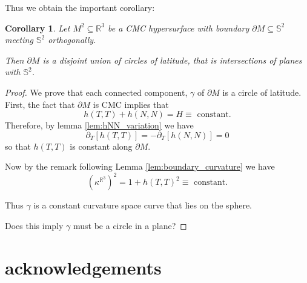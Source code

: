 \documentclass[10pt]{amsart}
\newcommand{\R}{\ensuremath{\mathbb{R}}}
\renewcommand{\S}{\ensuremath{\mathbb{S}}}
\newtheorem{cor}[thm]{Corollary}
\theoremstyle{remark}
\begin{document}
Thus we obtain the important corollary:
\begin{cor}
Let \(M^2 \subseteq \R^3\) be a \emph{CMC} hypersurface with boundary \(\partial M \subseteq \S^2\) meeting \(\S^2\) orthogonally.

Then \(\partial M\) is a disjoint union of circles of latitude, that is intersections of planes with \(\S^2\).
\end{cor}

\begin{proof}
We prove that each connected component, \(\gamma\) of \(\partial M\) is a circle of latitude. First, the fact that \(\partial M\) is CMC implies that
\[
h(T, T) + h(N, N) = H \equiv \text{ constant}.
\]
Therefore, by lemma \ref{lem:hNN_variation} we have
\[
\partial_T [h(T, T)] = - \partial_T [h(N, N)] = 0
\]
so that \(h(T, T)\) is constant along \(\partial M\).

Now by the remark following Lemma \ref{lem:boundary_curvature} we have
\[
(\kappa^{\R^3})^2 = 1 + h(T, T)^2 \equiv \text{ constant}.
\]

Thus \(\gamma\) is a constant curvature space curve that lies on the sphere.

{\color{red} Does this imply \(\gamma\) must be a circle in a plane?}
\end{proof}

\section*{acknowledgements}



\end{document}
